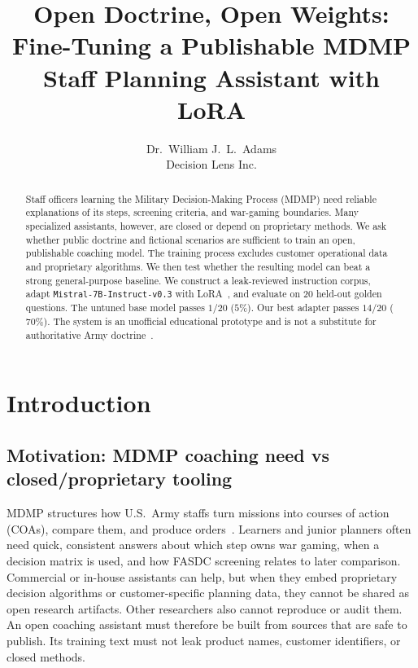 \documentclass[11pt]{article}
\title{Open Doctrine, Open Weights:\\
Fine-Tuning a Publishable MDMP Staff Planning Assistant with LoRA}
\author{Dr.\ William J.\ L.\ Adams\\
Decision Lens Inc.}
\date{}
\begin{document}
\maketitle

\begin{abstract}
Staff officers learning the Military Decision-Making Process (MDMP) need reliable
explanations of its steps, screening criteria, and war-gaming boundaries.
Many specialized assistants, however, are closed or depend on proprietary methods.
We ask whether public doctrine and fictional scenarios are sufficient to train an
open, publishable coaching model.
The training process excludes customer operational data and proprietary algorithms.
We then test whether the resulting model can beat a strong general-purpose baseline.
We construct a leak-reviewed instruction corpus, adapt
\texttt{Mistral-7B-Instruct-v0.3} with LoRA~\citep{hu2022lora}, and evaluate on
20 held-out golden questions.
The untuned base model passes $1/20$ ($5\%$).
Our best adapter passes $14/20$ ($70\%$).
The system is an unofficial educational prototype and is not a substitute for
authoritative Army doctrine~\citep{fm50,adp50}.
\end{abstract}

\section{Introduction}
\label{sec:intro}

\subsection{Motivation: MDMP coaching need vs closed/proprietary tooling}
\label{sec:intro-motivation}

MDMP structures how U.S.\ Army staffs turn missions into courses of action (COAs),
compare them, and produce orders~\citep{fm50,adp50}.
Learners and junior planners often need quick, consistent answers about which
step owns war gaming, when a decision matrix is used, and how FASDC screening
relates to later comparison.
Commercial or in-house assistants can help, but when they embed proprietary
decision algorithms or customer-specific planning data, they cannot be shared
as open research artifacts.
Other researchers also cannot reproduce or audit them.
An open coaching assistant must therefore be built from sources that are safe
to publish.
Its training text must not leak product names, customer identifiers, or closed
methods.
\end{document}
